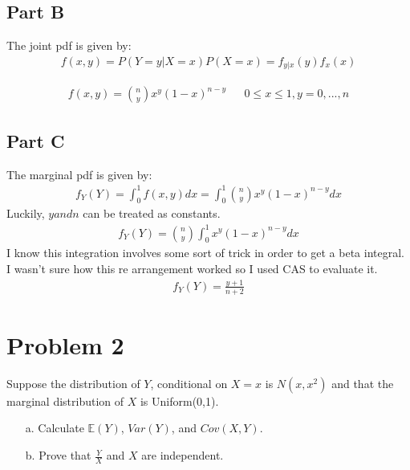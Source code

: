\documentclass{article}
\begin{document}
\subsection*{Part B}
The joint pdf is given by:
\begin{align*}
f(x,y) = P(Y=y|X=x)P(X=x) = f_{y|x}(y) f_x(x)
\end{align*}

\begin{align*}
f(x,y) = \binom{n}{y} x^y (1-x)^{n-y} && 0 \leq x \leq 1, y = 0,...,n
\end{align*}

\subsection*{Part C}
The marginal pdf is given by:
\begin{align*}
f_Y(Y) = \int_{0}^{1} f(x,y) dx = \int_{0}^{1} \binom{n}{y} x^y (1-x)^{n-y} dx
\end{align*}
Luckily, $y and n$ can be treated as constants.
\begin{align*}
f_Y(Y) = \binom{n}{y} \int_{0}^{1} x^y (1-x)^{n-y} dx
\end{align*}
I know this integration involves some sort of trick in order to get a beta integral. I wasn't sure how this re arrangement worked so I used CAS to evaluate it.
\begin{align*}
f_Y(Y) = \frac{y+1}{n+2}
\end{align*}

\pagebreak
\section*{Problem 2}
Suppose the distribution of $Y$, conditional on $X = x$ is $N(x, x^2)$ and that the marginal distribution of $X$ is Uniform(0,1).
\begin{enumerate}
\item[a.]
Calculate $\mathbb{E}(Y)$, $Var(Y)$, and $Cov(X,Y)$.
\item[b.]
Prove that $\frac{Y}{X}$ and $X$ are independent.
\end{enumerate}
\end{document}
